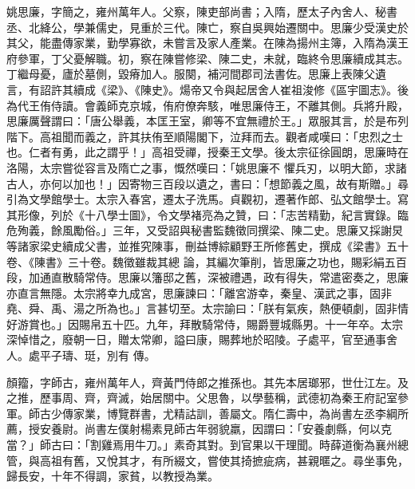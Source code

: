 \begin{pinyinscope}
 姚思廉，字簡之，雍州萬年人。父察，陳吏部尚書；入隋，歷太子內舍人、秘書丞、北絳公，學兼儒史，見重於三代。陳亡，察自吳興始遷關中。思廉少受漢史於其父，能盡傳家業，勤學寡欲，未嘗言及家人產業。在陳為揚州主簿，入隋為漢王府參軍，丁父憂解職。初，察在陳嘗修梁、陳二史，未就，臨終令思廉續成其志。丁繼母憂，廬於墓側，毀瘠加人。服闋，補河間郡司法書佐。思廉上表陳父遺
 言，有詔許其續成《梁》、《陳史》。煬帝又令與起居舍人崔祖浚修《區宇圖志》。後為代王侑侍讀。會義師克京城，侑府僚奔駭，唯思廉侍王，不離其側。兵將升殿，思廉厲聲謂曰：「唐公舉義，本匡王室，卿等不宜無禮於王。」眾服其言，於是布列階下。高祖聞而義之，許其扶侑至順陽閣下，泣拜而去。觀者咸嘆曰：「忠烈之士也。仁者有勇，此之謂乎！」高祖受禪，授秦王文學。後太宗征徐圓朗，思廉時在洛陽，太宗嘗從容言及隋亡之事，慨然嘆曰：「姚思廉不
 懼兵刃，以明大節，求諸古人，亦何以加也！」因寄物三百段以遺之，書曰：「想節義之風，故有斯贈。」尋引為文學館學士。太宗入春宮，遷太子洗馬。貞觀初，遷著作郎、弘文館學士。寫其形像，列於《十八學士圖》，令文學褚亮為之贊，曰：「志苦精勤，紀言實錄。臨危殉義，餘風勵俗。」三年，又受詔與秘書監魏徵同撰梁、陳二史。思廉又採謝炅等諸家梁史續成父書，並推究陳事，刪益博綜顧野王所修舊史，撰成《梁書》五十卷、《陳書》三十卷。魏徵雖裁其總
 論，其編次筆削，皆思廉之功也，賜彩絹五百段，加通直散騎常侍。思廉以籓邸之舊，深被禮遇，政有得失，常遣密奏之，思廉亦直言無隱。太宗將幸九成宮，思廉諫曰：「離宮游幸，秦皇、漢武之事，固非堯、舜、禹、湯之所為也。」言甚切至。太宗諭曰：「朕有氣疾，熱便頓劇，固非情好游賞也。」因賜帛五十匹。九年，拜散騎常侍，賜爵豐城縣男。十一年卒。太宗深悼惜之，廢朝一日，贈太常卿，謚曰康，賜葬地於昭陵。子處平，官至通事舍人。處平子璹、珽，別有
 傳。



 顏籀，字師古，雍州萬年人，齊黃門侍郎之推孫也。其先本居瑯邪，世仕江左。及之推，歷事周、齊，齊滅，始居關中。父思魯，以學藝稱，武德初為秦王府記室參軍。師古少傳家業，博覽群書，尤精詁訓，善屬文。隋仁壽中，為尚書左丞李綱所薦，授安養尉。尚書左僕射楊素見師古年弱貌羸，因謂曰：「安養劇縣，何以克當？」師古曰：「割雞焉用牛刀。」素奇其對。到官果以干理聞。時薛道衡為襄州總
 管，與高祖有舊，又悅其才，有所綴文，嘗使其掎摭疵病，甚親暱之。尋坐事免，歸長安，十年不得調，家貧，以教授為業。




\end{pinyinscope}
